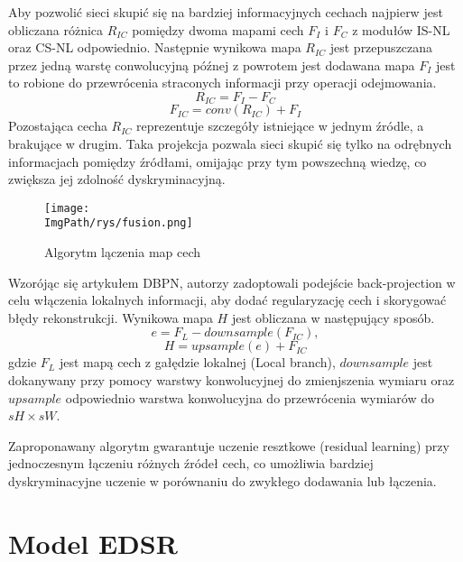 \documentclass[a4paper,12pt,twoside,openany]{report}
\newcommand{\ImgPath}{.}
\begin{document}
	Aby pozwolić sieci skupić się na bardziej informacyjnych cechach najpierw jest obliczana różnica $R_{IC}$ pomiędzy dwoma mapami cech $F_I$ i $F_C$  z modułów  IS-NL oraz CS-NL odpowiednio. Następnie wynikowa mapa $R_{IC}$ jest przepuszczana przez jedną warstę conwolucyjną późnej z powrotem jest dodawana mapa $F_I$ jest to robione do przewrócenia straconych informacji przy operacji odejmowania.
	\begin{equation}
		R_{IC}  = F_I - F_C
		\label{RIC}
	\end{equation}
	\begin{equation}
		F_{IC} = conv(R_{IC}) + F_I
 		\label{FIC}
	\end{equation}
	Pozostająca cecha $R_{IC}$ reprezentuje szczegóły istniejące w jednym źródle, a brakujące w drugim. Taka projekcja pozwala sieci skupić się tylko na odrębnych informacjach pomiędzy źródłami, omijając przy tym powszechną wiedzę, co zwiększa jej zdolność dyskryminacyjną.
	\begin{figure}[!htbp]
		\begin{center}
			\centering
			\texttt{[image: \\ImgPath/rys/fusion.png]}
		\end{center}
		\caption{Algorytm lączenia map cech}
		\label{Fusion}
	\end{figure} 
	
	Wzorójąc się artykułem DBPN, autorzy zadoptowali podejście back-projection w celu włączenia lokalnych informacji, aby dodać regularyzację cech i skorygować błędy rekonstrukcji. Wynikowa mapa $H$ jest obliczana w następujący sposób. 
	\begin{equation}
		e = F_L - downsample(F_{IC}),
		\label{RIC}
	\end{equation}
	\begin{equation}
		H = upsample(e) + F_{IC}
		\label{FIC}
	\end{equation}
	gdzie $F_L$ jest mapą cech z gałędzie lokalnej (Local branch), $downsample$ jest dokanywany przy pomocy warstwy konwolucyjnej do zmienjszenia wymiaru oraz $upsample$ odpowiednio warstwa konwolucyjna do przewrócenia wymiarów do $sH \times sW$. 
	
	Zaproponawany algorytm gwarantuje uczenie resztkowe (residual learning) przy jednoczesnym łączeniu różnych źródeł cech, co umożliwia bardziej dyskryminacyjne uczenie w porównaniu do zwykłego dodawania lub łączenia.
\section{Model EDSR}
\end{document}
